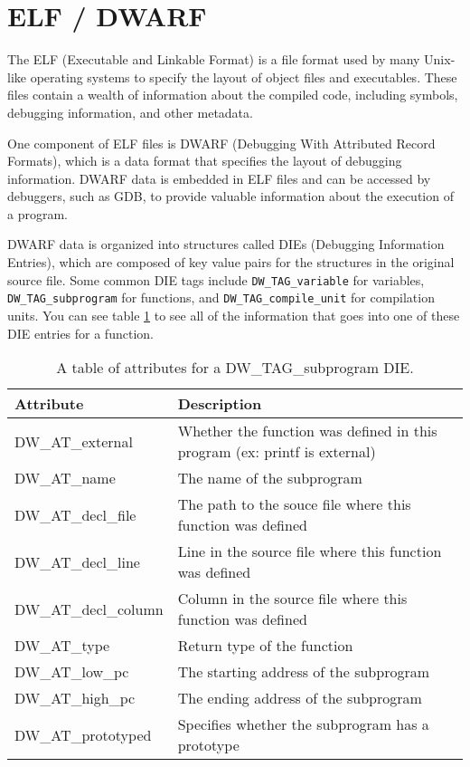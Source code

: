 \section{ELF / DWARF}
The ELF (Executable and Linkable Format)\cite{elf-book} is a file format used by many Unix-like operating systems to specify the layout of object files and executables. These files contain a wealth of information about the compiled code, including symbols, debugging information, and other metadata.

One component of ELF files is DWARF (Debugging With Attributed Record Formats)\cite{dwarf-site}, which is a data format that specifies the layout of debugging information. DWARF data is embedded in ELF files and can be accessed by debuggers, such as GDB, to provide valuable information about the execution of a program.

DWARF data is organized into structures called DIEs (Debugging Information Entries), which are composed of key value pairs for the structures in the original source file. Some common DIE tags include \texttt{DW\_TAG\_variable} for variables, \texttt{DW\_TAG\_subprogram} for functions, and \texttt{DW\_TAG\_compile\_unit} for compilation units. You can see table \ref{fig:subprogram_die} to see all of the information that goes into one of these DIE entries for a function.  

\begin{table}
\centering
    \begin{tabular}{l|l}
\textbf{Attribute} & \textbf{Description} \\ \hline
        DW\_AT\_external & Whether the function was defined in this program (ex: printf is external)\\ 
DW\_AT\_name & The name of the subprogram \\ 
DW\_AT\_decl\_file & The path to the souce file where this function was defined \\ 
DW\_AT\_decl\_line & Line in the source file where this function was defined\\ 
DW\_AT\_decl\_column & Column in the source file where this function was defined\\ 
DW\_AT\_type & Return type of the function \\ 
DW\_AT\_low\_pc & The starting address of the subprogram \\ 
DW\_AT\_high\_pc & The ending address of the subprogram \\ 
DW\_AT\_prototyped & Specifies whether the subprogram has a prototype \\ 
\end{tabular}
\caption{A table of attributes for a DW\_TAG\_subprogram DIE.}
    \label{fig:subprogram_die}
\end{table}

